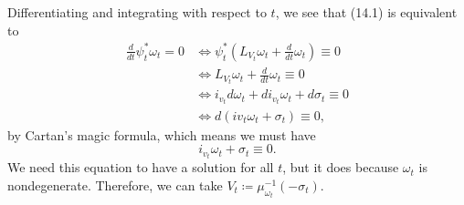 \documentclass[leqno, openany]{memoir}
\theoremstyle{definition}
\theoremstyle{remark}
\theoremstyle{plain}
\theoremstyle{definition}
\theoremstyle{remark}
\begin{document}
Differentiating and integrating with respect to $t$, we see that (14.1) is equivalent to
\begin{align*}
    \frac{d}{dt} \psi_t^*\omega_t = 0 &\Leftrightarrow \psi_t^*\left(L_{V_t} \omega_t + \frac{d}{dt} \omega_t \right) \equiv 0 \\
                                      &\Leftrightarrow L_{V_t} \omega_t + \frac{d}{dt} \omega_t \equiv 0 \\
                                      &\Leftrightarrow i_{v_t} d \omega_t + d i_{v_t} \omega_t + d \sigma_t \equiv 0 \\
                                      &\Leftrightarrow d (i v_t \omega_t + \sigma_t) \equiv 0,
\end{align*}
by Cartan's magic formula, which means we must have
\[ i_{v_t} \omega_t + \sigma_t \equiv 0. \]
We need this equation to have a solution for all $t$, but it does because $\omega_t$ is nondegenerate. Therefore, we can take $V_t \coloneqq \mu_{\omega_t}^{-1}(- \sigma_t)$.
\end{document}
